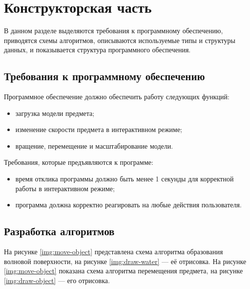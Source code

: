 \chapter{Конструкторская часть}

В данном разделе выделяются требования к программному обеспечению, приводятся схемы алгоритмов, описываются используемые типы и структуры данных, и показывается структура программного обеспечения.

\section{Требования к программному \newline обеспечению}

Программное обеспечение должно обеспечить работу следующих функций:

\begin{itemize}
	\item загрузка модели предмета;
	\item изменение скорости предмета в интерактивном режиме;
	\item вращение, перемещение и масштабирование модели.
\end{itemize}

Требования, которые предъявляются к программе:

\begin{itemize}
	\item время отклика программы должно быть менее 1 секунды для корректной работы в интерактивном режиме;
	\item программа должна корректно реагировать на любые действия пользователя.
\end{itemize}

\section{Разработка алгоритмов}

На рисунке \ref{img:move-object} представлена схема алгоритма образования волновой поверхности, на рисунке \ref{img:draw-water} --- её отрисовка. На рисунке \ref{img:move-object} показана схема алгоритма перемещения предмета, на рисунке \ref{img:draw-object} --- его отрисовка.


